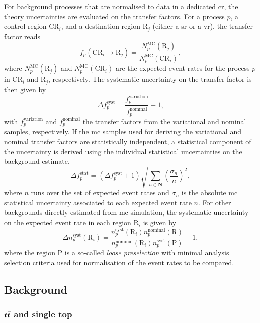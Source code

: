 For background processes that are normalised to data in a dedicated \gls{cr}, the theory uncertainties are evaluated on the transfer factors. For a process $p$, a control region CR$_i$, and a destination region R$_j$ (either a \gls{sr} or a \gls{vr}), the transfer factor reads
\begin{equation}
	f_p(\mathrm{CR}_i\rightarrow \mathrm{R}_j) = \frac{N^\mathrm{MC}_p(\mathrm{R}_j)}{N^\mathrm{MC}_p(\mathrm{CR}_i)},
\end{equation}
where $N^\mathrm{MC}_p(\mathrm{R}_j)$ and $N^\mathrm{MC}_p(\mathrm{CR}_i)$ are the expected event rates for the process $p$ in CR$_i$ and R$_j$, respectively. The systematic uncertainty on the transfer factor is then given by
\begin{equation}
	\Delta f_p^\mathrm{syst} = \frac{f_p^\mathrm{variation}}{f_p^\mathrm{nominal}} - 1,
\end{equation}
with $f_p^\mathrm{variation}$ and $f_p^\mathrm{nominal}$ the transfer factors from the variational and nominal samples, respectively. If the \gls{mc} samples used for deriving the variational and nominal transfer factors are statistically independent, a statistical component of the uncertainty is derived using the individual statistical uncertainties on the background estimate,
\begin{equation}
	\Delta f_p^\mathrm{stat} = (\Delta f_p^\mathrm{syst} + 1 ) \sqrt{\sum_{n\in\boldsymbol{N}}(\frac{\sigma_n}{n})^2},
\end{equation}
 where $n$ runs over the set of expected event rates and $\sigma_n$ is the absolute \gls{mc} statistical uncertainty associated to each expected event rate $n$. For other backgrounds directly estimated from \gls{mc} simulation, the systematic uncertainty on the expected event rate in each region R$_i$ is given by
 \begin{equation}
 	\Delta n_p^\mathrm{syst}(\mathrm{R}_i) = \frac{n_p^\mathrm{syst}(\mathrm{R}_i)n_p^\mathrm{nominal}(\mathrm{R})}{n_p^\mathrm{nominal}(\mathrm{R}_i)n_p^\mathrm{syst}(\mathrm{P})} - 1,
 \end{equation}
 where the region P is a so-called \textit{loose preselection} with minimal analysis selection criteria used for normalisation of the event rates to be compared.
 
 
 \subsection{Background}
 
 \subsubsection{$\boldsymbol{t\bar{t}}$ and single top}
 
